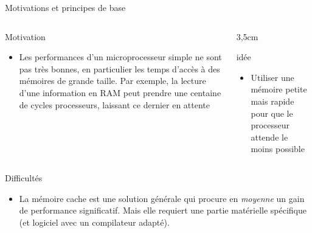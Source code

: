 %
\begin{Frame}{Motivations et principes de base}
  \begin{columns}[t]
    \begin{column}{8cm} %
      \begin{block}{Motivation}
        \begin{itemize}
        \item Les performances d'un microprocesseur simple ne sont pas très bonnes, en particulier les temps d'accès à des mémoires de grande taille. Par exemple, la lecture d'une information en RAM peut prendre une centaine de cycles processeurs, laissant ce dernier en attente
        \end{itemize}
      \end{block} 
    \end{column}
    
    \begin{column}{3,5cm} %
      \begin{block}{idée}
\begin{itemize}
        \item Utiliser une mémoire petite mais rapide pour que le processeur attende le moins possible
        \end{itemize}
      \end{block}   
    \end{column}
  \end{columns}  

\begin{block}{Difficultés}
       \begin{center}
 	\begin{itemize}
         \item La mémoire cache est une solution générale qui procure en \emph{moyenne} un gain de performance significatif. Mais elle requiert une partie matérielle spécifique (et logiciel avec un compilateur adapté). 
        \end{itemize}
       \end{center}
      \end{block}   

\end{Frame}


